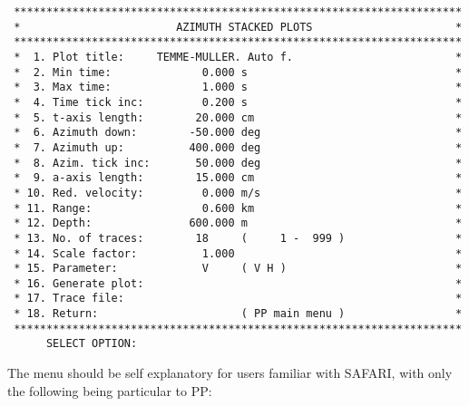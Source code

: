 \small
\begin{verbatim}
 *********************************************************************
 *                        AZIMUTH STACKED PLOTS                      *
 *********************************************************************
 *  1. Plot title:     TEMME-MULLER. Auto f.                         *
 *  2. Min time:              0.000 s                                *
 *  3. Max time:              1.000 s                                *
 *  4. Time tick inc:         0.200 s                                *
 *  5. t-axis length:        20.000 cm                               *
 *  6. Azimuth down:        -50.000 deg                              *
 *  7. Azimuth up:          400.000 deg                              *
 *  8. Azim. tick inc:       50.000 deg                              *
 *  9. a-axis length:        15.000 cm                               *
 * 10. Red. velocity:         0.000 m/s                              *
 * 11. Range:                 0.600 km                               *
 * 12. Depth:               600.000 m                                *
 * 13. No. of traces:        18     (     1 -  999 )                 *
 * 14. Scale factor:          1.000                                  *
 * 15. Parameter:             V     ( V H )                          *
 * 16. Generate plot:                                                *
 * 17. Trace file:                                                   *
 * 18. Return:                      ( PP main menu )                 *
 *********************************************************************
      SELECT OPTION: 
\end{verbatim}
\normalsize 
    The  menu should be self explanatory for users familiar  with 
SAFARI, with only the following being particular to PP: 
